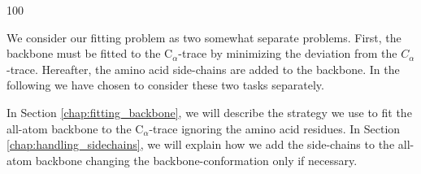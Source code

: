 \documentclass[a0,portrait]{a0poster}
\newcommand{\Ca}{C$_{\alpha}${}}
\begin{document}
\begin{GridBlock}{0}{21}{100}
\begin{multicols}{3}
We consider our fitting problem as two somewhat separate problems.
First, the backbone must be fitted to the \Ca-trace by minimizing
the deviation from the $C_{\alpha}$-trace.  Hereafter, the amino acid
side-chains are added to the backbone.  In the following we have chosen to
consider these two tasks separately.

In Section \ref{chap:fitting_backbone}, we will describe the strategy we use to fit the all-atom backbone to the \Ca-trace ignoring the amino acid residues.
In Section \ref{chap:handling_sidechains}, we will explain how we add the side-chains to the all-atom backbone changing the backbone-conformation only if necessary.


\end{multicols}
\end{GridBlock}
\end{document}
